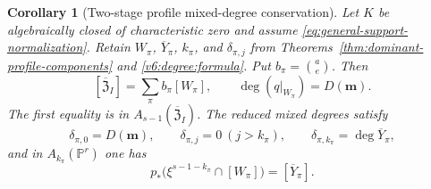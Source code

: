 \documentclass[10pt,fleqn]{article}
\numberwithin{equation}{section}
\newtheorem{corollary}[theorem]{Corollary}
\newcommand{\PP}{\mathbb P}
\begin{document}
\begin{corollary}[Two-stage profile mixed-degree conservation]
\label{thm:profile-multidegrees}
Let $K$ be algebraically closed of characteristic zero and assume
\eqref{eq:general-support-normalization}.  Retain $W_\pi$, $\overline Y_\pi$, $k_\pi$, and $\delta_{\pi,j}$ from
Theorems~\ref{thm:dominant-profile-components} and
\ref{v6:degree:formula}.  Put $b_\pi=\binom ae$.  Then
\begin{equation}\label{eq:profile-cycle-decomposition}
 [\overline{\mathfrak Z}_I]=\sum_\pi b_\pi[W_\pi],
 \qquad \deg(q|_{W_\pi})=D(\boldsymbol m).
\end{equation}
The first equality is in $A_{s-1}(\overline{\mathfrak Z}_I)$.
The reduced mixed degrees satisfy
\[
 \delta_{\pi,0}=D(\boldsymbol m),\qquad
 \delta_{\pi,j}=0\ (j>k_\pi),\qquad
 \delta_{\pi,k_\pi}=\deg\overline Y_\pi,
\]
and in $A_{k_\pi}(\PP^r)$ one has
\begin{equation}\label{eq:profile-image-pushforward}
 p_*\bigl(\xi^{s-1-k_\pi}\cap[W_\pi]\bigr)
 =[\overline Y_\pi].
\end{equation}


\end{corollary}
\end{document}
